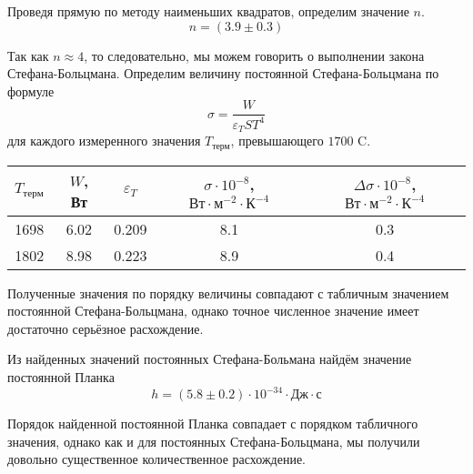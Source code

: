 \documentclass[12pt]{article}
\begin{document}
\par
	Проведя прямую по методу наименьших квадратов, определим значение $n$.
\[
	n = \left(3.9 \pm 0.3 \right)
\]
\par
	Так как $n \approx 4$, то следовательно, мы можем говорить о выполнении закона Стефана-Больцмана. Определим величину постоянной Стефана-Больцмана по формуле
\[
	\sigma = \frac{W}{\varepsilon_T S T^4}
\]
для каждого измеренного значения $T_\text{терм}$, превышающего $1700$ \degree C.
\begin{table}[h!]
	\centering
	\begin{tabular}{|c|c|c|c|c|}
	\hline
		$T_\text{терм}$ & $W$, Вт & $\varepsilon_T$ & $\sigma \cdot 10^{-8}$, $\text{Вт} \cdot \text{м}^{-2} \cdot \text{К}^{-4}$ & $\Delta \sigma \cdot 10^{-8}$, $\text{Вт} \cdot \text{м}^{-2} \cdot \text{К}^{-4}$ \\
	\hline
		1698 & 6.02 & 0.209 & 8.1 & 0.3 \\
	\hline
		1802 & 8.98 & 0.223 & 8.9 & 0.4 \\
	\hline
	\end{tabular}
\end{table}
\par
	Полученные значения по порядку величины совпадают с табличным значением постоянной Стефана-Больцмана, однако точное численное значение имеет достаточно серьёзное расхождение.
\par
	Из найденных значений постоянных Стефана-Больмана найдём значение постоянной Планка
\[
	h = \left(5.8 \pm 0.2 \right) \cdot 10^{-34} \cdot \text{Дж} \cdot \text{с}
\]
\par
	Порядок найденной постоянной Планка совпадает с порядком табличного значения, однако как и для постоянных Стефана-Больцмана, мы получили довольно существенное количественное расхождение.
\end{document}
